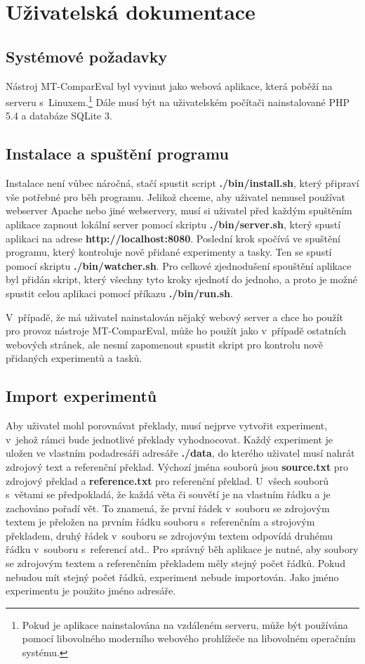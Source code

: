 \chapter{Uživatelská dokumentace}
\label{chap:users}

\section{Systémové požadavky}
Nástroj \mbox{MT-ComparEval} byl vyvinut jako webová aplikace,
  která poběží na serveru s~Linuxem.\footnote{
    Pokud je aplikace nainstalována na vzdáleném serveru, může být používána pomocí libovolného moderního webového prohlížeče na libovolném operačním systému.
  }
Dále musí být na uživatelském počítači nainstalované PHP 5.4 a databáze SQLite 3.

\section{Instalace a spuštění programu}
Instalace není vůbec náročná,
  stačí spustit script \textbf{./bin/install.sh},
  který připraví vše potřebné pro běh programu. 
Jelikož chceme,
  aby uživatel nemusel používat webserver Apache nebo jiné webservery,
  musí si uživatel před každým spuštěním aplikace zapnout lokální server pomocí skriptu \textbf{./bin/server.sh},
  který spustí aplikaci na adrese \textbf{http://localhost:8080}.
Poslední krok spočívá ve spuštění programu,
  který kontroluje nově přidané experimenty a tasky.
Ten se spustí pomocí skriptu \textbf{./bin/watcher.sh}.
Pro celkové zjednodušení spouštění aplikace byl přidán skript,
  který všechny tyto kroky sjednotí do jednoho,
  a proto je možné spustit celou aplikaci pomocí příkazu \textbf{./bin/run.sh}.

V~případě, že má uživatel nainstalován nějaký webový server
  a chce ho použít pro provoz nástroje \mbox{MT-ComparEval},
  může ho použít jako v~případě ostatních webových stránek,
  ale nesmí zapomenout spustit skript pro kontrolu nově přidaných experimentů a tasků.

\section{Import experimentů}
Aby uživatel mohl porovnávat překlady,
  musí nejprve vytvořit experiment,
  v~jehož rámci bude jednotlivé překlady vyhodnocovat.
Každý experiment je uložen ve vlastním podadresáři adresáře \textbf{./data},
  do kterého uživatel musí nahrát zdrojový text a referenční překlad.
Výchozí jména souborů jsou \textbf{source.txt} pro zdrojový překlad
  a \textbf{reference.txt} pro referenční překlad.
U~všech souborů s~větami se předpokladá,
  že každá věta či souvětí je na vlastním řádku
  a je zachováno pořadí vět.
To znamená, že první řádek v~souboru se zdrojovým textem je přeložen na prvním řádku souboru s~referenčním a strojovým překladem,
  druhý řádek v~souboru se zdrojovým textem odpovídá druhému řádku v~souboru s~referencí atd..
Pro správný běh aplikace je nutné, aby soubory se zdrojovým textem a referenčním překladem měly stejný počet řádků.
Pokud nebudou mít stejný počet řádků, experiment nebude importován.
Jako jméno experimentu je použito jméno adresáře.

